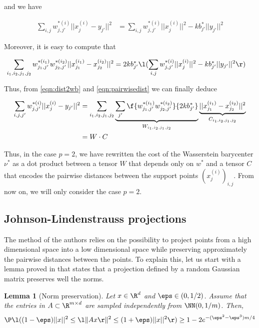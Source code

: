 \documentclass[11pt,a4paper]{article}
\newtheorem{lemma}{Lemma}
\begin{document}
and we have

\begin{align}
\label{eqn:dist2wb}
\sum_{i, j} w^{*(i)}_{j, j'} ||x^{(i)}_j - y_{j'}||^2 &= \sum_{i, j} w^{*(i)}_{j, j'} ||x^{(i)}_j||^2 - kb^*_{j'} ||y_{j'}||^2
\end{align}

Moreover, it is easy to compute that

\begin{align}
\label{eqn:pairwisedist}
\sum_{i_1, i_2, j_1, j_2} w^{*(i_1)}_{j_1, j'} w^{*(i_2)}_{j_2, j'} ||x^{(i_1)}_{j_1} - x^{(i_2)}_{j_2}||^2 &= 2 kb^*_{j'} \l( \sum_{i, j} w^{*(i)}_{j, j'} ||x^{(i)}_j||^2 - kb^*_{j'} ||y_{j'}||^2 \r)
\end{align}

Thus, from \ref{eqn:dist2wb} and \ref{eqn:pairwisedist} we can finally deduce

\begin{align}
\sum_{i, j, j'} w^{*(i)}_{j, j'} ||x^{(i)}_j - y_{j'}||^2 &= \sum_{i_1, i_2, j_1, j_2} \underbrace{ \sum_{j'} \f {w^{*(i_1)}_{j_1, j'} w^{*(i_2)}_{j_2, j'}} {2kb^*_{j'}} }_{W_{i_1, i_2, j_1, j_2}} \underbrace{||x^{(i_1)}_{j_1} - x^{(i_2)}_{j_2}||^2}_{C_{i_1, i_2, j_1, j_2}} \\
&= W \cdot C \label{eqn:dotproduct}
\end{align}

Thus, in the case $p=2$, we have rewritten the cost of the Wasserstein barycenter $\nu^*$ as a dot product between a tensor $W$ that depends only on $w^*$ and a tensor $C$ that encodes the pairwise distances between the support points $(x^{(i)}_j)_{i, j}$. From now on, we will only consider the case $p=2$.

\subsection{Johnson-Lindenstrauss projections}
\label{subscn:johnson}

The method of the authors relies on the possibility to project points from a high dimensional space into a low dimensional space while preserving approximately the pairwise distances between the points. 
To explain this, let us start with a lemma proved in \cite{kakade_random_2009} that states that a projection defined by a random Gaussian matrix preserves well the norms.

\begin{lemma}[Norm preservation]
\label{lemma:norm}
Let $x\in \R^d$ and $\eps \in (0, 1/2)$. Assume that the entries in $A\subset \R^{m\times d}$ are sampled independently from $\NN(0, 1 / m)$. Then,
$$\P \l( (1 - \eps) ||x||^2 \leq \l\lVert A x \r\rVert^2 \leq (1 + \eps) ||x||^2 \r) \geq 1 - 2e^{-(\eps^2 -\eps^3) m / 4} $$
\end{lemma}
\end{document}

